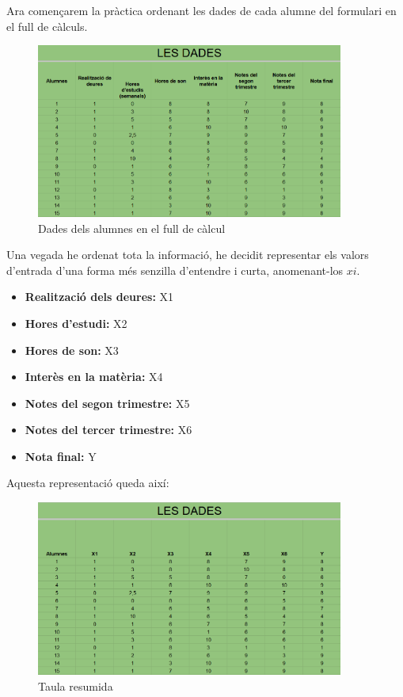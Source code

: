 Ara començarem la pràctica ordenant les dades de cada alumne del formulari en el full de càlculs.

\begin{figure}[h!]
    \centering
    \includegraphics[width=0.9\textwidth]{./figures/Dades.png}
    \caption{Dades dels alumnes en el full de càlcul}
\end{figure}

Una vegada he ordenat tota la informació, he decidit representar els valors d'entrada d'una forma més senzilla d'entendre i curta, anomenant-los $xi$.
\begin{itemize}
 \item \textbf {Realització dels deures:} X1
 \item \textbf {Hores d'estudi:} X2
 \item \textbf {Hores de son:} X3
 \item \textbf {Interès en la matèria:} X4
 \item \textbf {Notes del segon trimestre:} X5
 \item \textbf {Notes del tercer trimestre:} X6
 \item \textbf {Nota final:} Y
\end{itemize}

Aquesta representació queda així:

\begin{figure}[h!]
    \centering
    \includegraphics[width=0.9\textwidth]{./figures/Dades_resumides.png}
    \caption{Taula resumida}
\end{figure}

